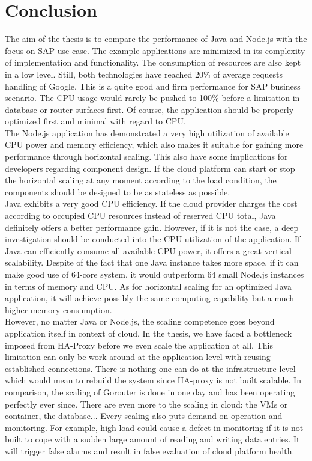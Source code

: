 \chapter{Conclusion}
The aim of the thesis is to compare the performance of Java and Node.js with the focus on SAP use case. The example applications are minimized in its complexity of implementation and functionality. The consumption of resources are also kept in a low level. Still, both technologies have reached 20\% of average requests handling of Google\citep{Google}. This is a quite good and firm performance for SAP business scenario. The CPU usage would rarely be pushed to 100\% before a limitation in database or router surfaces first. Of course, the application should be properly optimized first and minimal with regard to CPU. \\
The Node.js application has demonstrated a very high utilization of available CPU power and memory efficiency, which also makes it suitable for gaining more performance through horizontal scaling. This also have some implications for developers regarding component design. If the cloud platform can start or stop the horizontal scaling at any moment according to the load condition, the components should be designed to be as stateless as possible.\\
Java exhibits a very good CPU efficiency. If the cloud provider charges the cost according to occupied CPU resources instead of reserved CPU total, Java definitely offers a better performance gain. However, if it is not the case, a deep investigation should be conducted into the CPU utilization of the application. If Java can efficiently consume all available CPU power, it offers a great vertical scalability. Despite of the fact that one Java instance takes more space, if it can make good use of 64-core system, it would outperform 64 small Node.js instances in terms of memory and CPU. As for horizontal scaling for an optimized Java application, it will achieve possibly the same computing capability but a much higher memory consumption. \\
However, no matter Java or Node.js, the scaling competence goes beyond application itself in context of cloud. In the thesis, we have faced a bottleneck imposed from HA-Proxy before we even scale the application at all. This limitation can only be work around at the application level with reusing established connections. There is nothing one can do at the infrastructure level which would mean to rebuild the system since HA-proxy is not built scalable. In comparison, the scaling of Gorouter is done in one day and has been operating perfectly ever since. There are even more to the scaling in cloud: the VMs or container, the database... Every scaling also puts demand on operation and monitoring. For example, high load could cause a defect in monitoring if it is not built to cope with a sudden large amount of reading and writing data entries. It will trigger false alarms and result in false evaluation of cloud platform health. 